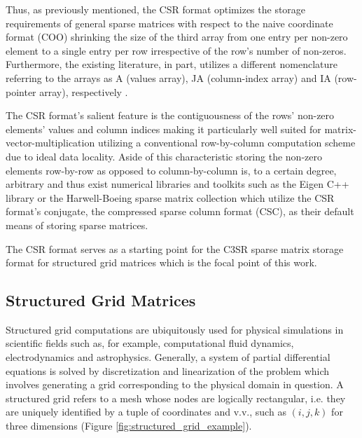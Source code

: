 \documentclass{article}
\begin{document}
    Thus, as previously mentioned, the CSR format optimizes the storage requirements of general sparse matrices with respect to the naive coordinate format (COO) shrinking the size of the third array from one entry per non-zero element to a single entry per row irrespective of the row's number of non-zeros. Furthermore, the existing literature, in part, utilizes a different nomenclature referring to the arrays as A (values array), JA (column-index array) and IA (row-pointer array), respectively \cite{sparskit}.

    The CSR format's salient feature is the contiguousness of the rows' non-zero elements' values and column indices making it particularly well suited for matrix-vector-multiplication utilizing a conventional row-by-column computation scheme due to ideal data locality. Aside of this characteristic storing the non-zero elements row-by-row as opposed to column-by-column is, to a certain degree, arbitrary and thus exist numerical libraries and toolkits such as the Eigen C++ library \cite{eigen:website} or the Harwell-Boeing sparse matrix collection \cite{harwell-boeing} which utilize the CSR format's conjugate, the compressed sparse column format (CSC), as their default means of storing sparse matrices.

    The CSR format serves as a starting point for the C3SR sparse matrix storage format for structured grid matrices which is the focal point of this work.

  \subsection{Structured Grid Matrices} \label{subsec:structured-grid-matrices}

    Structured grid computations are ubiquitously used for physical simulations in scientific fields such as, for example, computational fluid dynamics, electrodynamics and astrophysics. Generally, a system of partial differential equations is solved by discretization and linearization of the problem which involves generating a grid corresponding to the physical domain in question. A structured grid refers to a mesh whose nodes are logically rectangular, i.e. they are uniquely identified by a tuple of coordinates and v.v., such as $(i, j, k)$ for three dimensions (Figure \ref{fig:structured_grid_example}).
\end{document}
